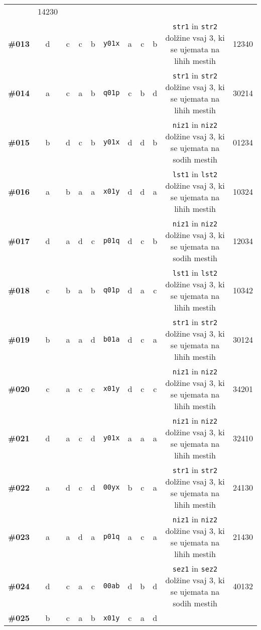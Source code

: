 \documentclass[arhiv, 10pt]{../izpit}
\newcommand{\inlinepy}[1]{\texttt{#1}}
\begin{document}
{\begin{tabular}{rcccccccccc}
     & 14230\\
\textbf{\#013} & d & c & c & b & \inlinepy{y01x} & a & c & b & 
        \inlinepy{str1} in \inlinepy{str2} dolžine vsaj 3, ki se ujemata na lihih mestih
     & 12340\\
\textbf{\#014} & a & c & a & b & \inlinepy{q01p} & c & b & d & 
        \inlinepy{str1} in \inlinepy{str2} dolžine vsaj 3, ki se ujemata na lihih mestih
     & 30214\\
\textbf{\#015} & b & d & c & b & \inlinepy{y01x} & d & d & b & 
        \inlinepy{niz1} in \inlinepy{niz2} dolžine vsaj 3, ki se ujemata na sodih mestih
     & 01234\\
\textbf{\#016} & a & b & a & a & \inlinepy{x01y} & d & d & a & 
        \inlinepy{lst1} in \inlinepy{lst2} dolžine vsaj 3, ki se ujemata na lihih mestih
     & 10324\\
\textbf{\#017} & d & a & d & c & \inlinepy{p01q} & d & c & b & 
        \inlinepy{niz1} in \inlinepy{niz2} dolžine vsaj 3, ki se ujemata na sodih mestih
     & 12034\\
\textbf{\#018} & c & b & a & b & \inlinepy{q01p} & d & a & c & 
        \inlinepy{lst1} in \inlinepy{lst2} dolžine vsaj 3, ki se ujemata na lihih mestih
     & 10342\\
\textbf{\#019} & b & a & a & d & \inlinepy{b01a} & d & c & a & 
        \inlinepy{str1} in \inlinepy{str2} dolžine vsaj 3, ki se ujemata na lihih mestih
     & 30124\\
\textbf{\#020} & c & a & c & c & \inlinepy{x01y} & d & c & c & 
        \inlinepy{niz1} in \inlinepy{niz2} dolžine vsaj 3, ki se ujemata na lihih mestih
     & 34201\\
\textbf{\#021} & d & a & c & d & \inlinepy{y01x} & a & a & a & 
        \inlinepy{niz1} in \inlinepy{niz2} dolžine vsaj 3, ki se ujemata na lihih mestih
     & 32410\\
\textbf{\#022} & a & d & c & d & \inlinepy{00yx} & b & c & a & 
        \inlinepy{str1} in \inlinepy{str2} dolžine vsaj 3, ki se ujemata na lihih mestih
     & 24130\\
\textbf{\#023} & a & a & d & a & \inlinepy{p01q} & a & c & a & 
        \inlinepy{niz1} in \inlinepy{niz2} dolžine vsaj 3, ki se ujemata na lihih mestih
     & 21430\\
\textbf{\#024} & d & c & a & c & \inlinepy{00ab} & d & b & d & 
        \inlinepy{sez1} in \inlinepy{sez2} dolžine vsaj 3, ki se ujemata na sodih mestih
     & 40132\\
\textbf{\#025} & b & c & a & b & \inlinepy{x01y} & c & a & d & 

\end{tabular}}
\end{document}
